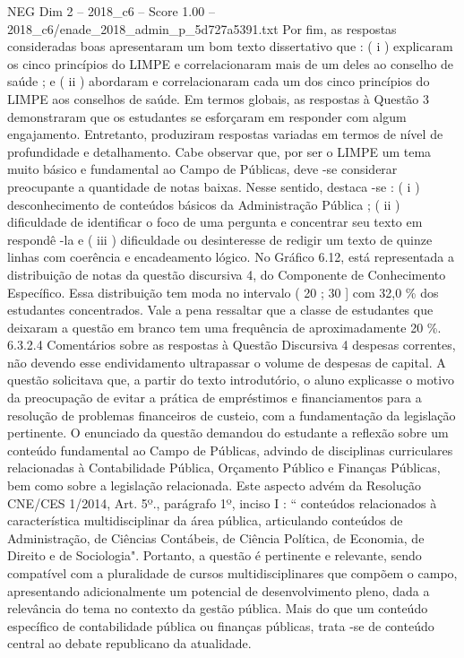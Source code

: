 \begin{textsample}{NEG Dim 2 – 2018\_c6 – Score 1.00 – 2018\_c6/enade\_2018\_admin\_p\_5d727a5391.txt}
Por fim, as respostas consideradas boas apresentaram um bom texto dissertativo que : ( i ) explicaram os cinco princípios do LIMPE e correlacionaram mais de um deles ao conselho de saúde ; e ( ii ) abordaram e correlacionaram cada um dos cinco princípios do LIMPE aos conselhos de saúde.
Em termos globais, as respostas à Questão 3 demonstraram que os estudantes se esforçaram em responder com algum engajamento.
Entretanto, produziram respostas variadas em termos de nível de profundidade e detalhamento.
Cabe observar que, por ser o LIMPE um tema muito básico e fundamental ao Campo de Públicas, deve -se considerar preocupante a quantidade de notas baixas.
Nesse sentido, destaca -se : ( i ) desconhecimento de conteúdos básicos da Administração Pública ; ( ii ) dificuldade de identificar o foco de uma pergunta e concentrar seu texto em respondê -la e ( iii ) dificuldade ou desinteresse de redigir um texto de quinze linhas com coerência e encadeamento lógico.
No Gráfico 6.12, está representada a distribuição de notas da questão discursiva 4, do Componente de Conhecimento Específico.
Essa distribuição tem moda no intervalo ( 20 ; 30 ] com 32,0 \% dos estudantes concentrados.
Vale a pena ressaltar que a classe de estudantes que deixaram a questão em branco tem uma frequência de aproximadamente 20 \%. 6.3.2.4 Comentários sobre as respostas à Questão Discursiva 4 despesas correntes, não devendo esse endividamento ultrapassar o volume de despesas de capital.
A questão solicitava que, a partir do texto introdutório, o aluno explicasse o motivo da preocupação de evitar a prática de empréstimos e financiamentos para a resolução de problemas financeiros de custeio, com a fundamentação da legislação pertinente.
O enunciado da questão demandou do estudante a reflexão sobre um conteúdo fundamental ao Campo de Públicas, advindo de disciplinas curriculares relacionadas à Contabilidade Pública, Orçamento Público e Finanças Públicas, bem como sobre a legislação relacionada.
Este aspecto advém da Resolução CNE/CES 1/2014, Art. 5º., parágrafo 1º, inciso I : “ conteúdos relacionados à característica multidisciplinar da área pública, articulando conteúdos de Administração, de Ciências Contábeis, de Ciência Política, de Economia, de Direito e de Sociologia".
Portanto, a questão é pertinente e relevante, sendo compatível com a pluralidade de cursos multidisciplinares que compõem o campo, apresentando adicionalmente um potencial de desenvolvimento pleno, dada a relevância do tema no contexto da gestão pública.
Mais do que um conteúdo específico de contabilidade pública ou finanças públicas, trata -se de conteúdo central ao debate republicano da atualidade.

\end{textsample}

